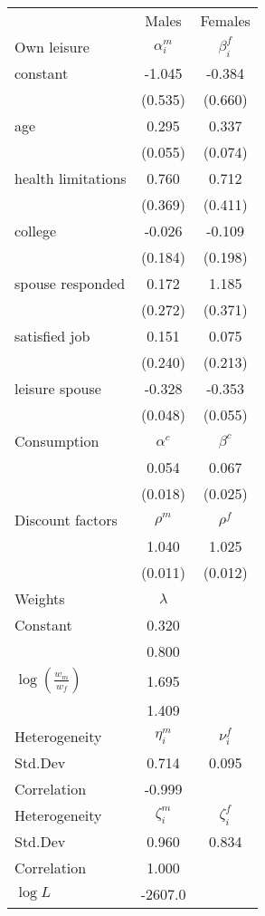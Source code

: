 \begin{tabular}{lcc} 
\hline\hline 
 & Males & Females \\ 
Own leisure & $\alpha_{i}^{m}$ & $\beta_{i}^{f}$ \\ 
constant & -1.045 & -0.384 \\ 
 & (0.535) & (0.660) \\ 
age & 0.295 & 0.337 \\ 
 & (0.055) & (0.074) \\ 
health limitations & 0.760 & 0.712 \\ 
 & (0.369) & (0.411) \\ 
college & -0.026 & -0.109 \\ 
 & (0.184) & (0.198) \\ 
spouse responded & 0.172 & 1.185 \\ 
 & (0.272) & (0.371) \\ 
satisfied job & 0.151 & 0.075 \\ 
 & (0.240) & (0.213) \\ 
leisure spouse & -0.328 & -0.353 \\ 
 & (0.048) & (0.055) \\ 
Consumption & $\alpha^{c}$ & $\beta^{c}$ \\ 
 & 0.054 & 0.067 \\ 
 & (0.018) & (0.025) \\ 
Discount factors & $\rho^m$ & $\rho^f$ \\ 
 & 1.040 & 1.025 \\ 
 & (0.011) & (0.012) \\ 
Weights & $\lambda$ &  \\ 
Constant & 0.320 &  \\ 
 & 0.800 &  \\ 
$\log(\frac{w_m}{w_f})$ & 1.695 &  \\ 
 & 1.409 &  \\ 
Heterogeneity & $\eta_i^m$ & $\nu_i^f$ \\ 
Std.Dev & 0.714 & 0.095 \\ 
Correlation & -0.999 &  \\ 
Heterogeneity & $\zeta_i^m$ & $\zeta_i^f$ \\ 
Std.Dev & 0.960 & 0.834 \\ 
Correlation & 1.000 &  \\ 
\hline 
$\log L$ & -2607.0 & \\ 
\hline \hline 
\end{tabular} 
